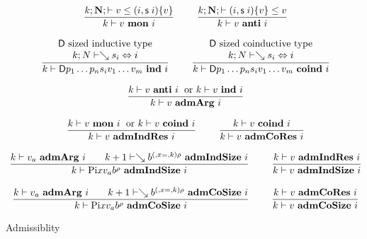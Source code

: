 \newcommand{\mon}[3]{#1\vdash#2\mbox{ \textbf{mon} }#3}
\newcommand{\anti}[3]{#1\vdash#2\mbox{ \textbf{anti} }#3}
\newcommand{\indu}[3]{#1\vdash#2\mbox{ \textbf{ind} }#3}
\newcommand{\coind}[3]{#1\vdash#2\mbox{ \textbf{coind} }#3}
\newcommand{\admIndSize}[3]{#1\vdash#2\mbox{ \textbf{admIndSize} }#3}
\newcommand{\admCoSize}[3]{#1\vdash#2\mbox{ \textbf{admCoSize} }#3}
\newcommand{\admArg}[3]{#1\vdash#2\mbox{ \textbf{admArg} }#3}
\newcommand{\admIndRes}[3]{#1\vdash#2\mbox{ \textbf{admIndRes} }#3}
\newcommand{\admCoRes}[3]{#1\vdash#2\mbox{ \textbf{admCoRes} }#3}

\begin{figure}
\begin{gather*}
\nru{}
{\LeqVal{k}{\nF}{v}{\subst{(i,\s i)}{v}}}
{\mon{k}{v}{i}}
\qquad
\nru{}
{\LeqVal{k}{\nF}{\subst{(i,\s i)}{v}}{v}}
{\anti{k}{v}{i}}
\\[2ex]
\ndru{}
{\DD \mbox{ sized inductive type}}
{\EqVal{k}{N}{\wh s_i}{i}}
{\indu{k}{\DD p_1 \ldots p_n s_i v_1 \ldots v_m}{i}}
\qquad
\ndru{}
{\DD \mbox{ sized coinductive type}}
{\EqVal{k}{N}{\wh s_i}{i}}
{\coind{k}{\DD p_1 \ldots p_n s_i v_1 \ldots v_m}{i}}
\\[2ex]
\nru{}
{\anti{k}{v}{i} \; \mbox{ or } \indu{k}{v}{i}}
{\admArg{k}{v}{i}}
\\[2ex]
\nru{}
{\mon{k}{v}{i} \; \mbox{ or } \coind{k}{v}{i}}
{\admIndRes{k}{v}{i}}
\qquad
\nru{}
{\coind{k}{v}{i}}
{\admCoRes{k}{v}{i}}
\\[2ex]
\nru{}
{\admArg{k}{v_a}{i} 
\qquad
{\admIndSize{k+1}{\wh \cl{b}{\ins (x,k) \rho}}{i}}}
{\admIndSize{k}{\vpi x v_a \cl{b}{\rho}}{i}}
\qquad
\nru{}
{\admIndRes{k}{v}{i}}
{\admIndSize{k}{v}{i}}
\\[2ex]
\nru{}
{\admArg{k}{v_a}{i} 
\qquad
{\admCoSize{k+1}{\wh \cl{b}{\ins (x,k) \rho}}{i}}}
{\admCoSize{k}{\vpi x v_a \cl{b}{\rho}}{i}}
\qquad
\nru{}
{\admCoRes{k}{v}{i}}
{\admCoSize{k}{v}{i}}
\end{gather*}
\caption{Admissiblity}
\end{figure}

